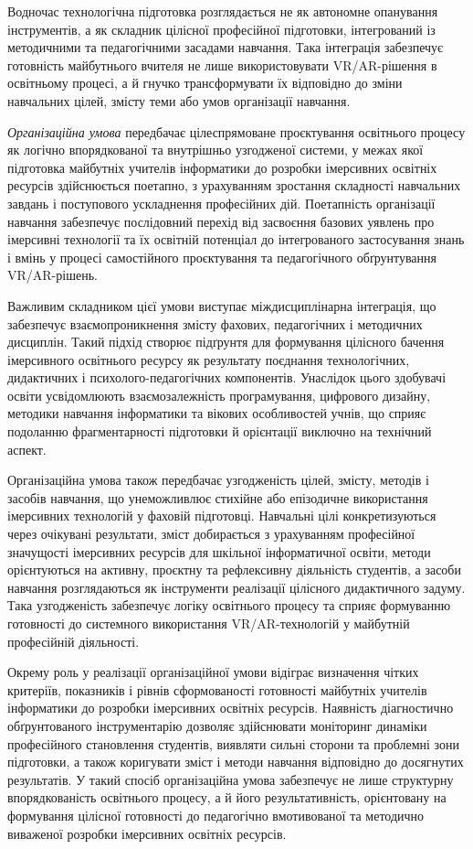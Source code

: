 Водночас технологічна підготовка розглядається не як автономне опанування інструментів, а як складник цілісної професійної підготовки, інтегрований із методичними та педагогічними засадами навчання. Така інтеграція забезпечує готовність майбутнього вчителя не лише використовувати VR/AR-рішення в освітньому процесі, а й гнучко трансформувати їх відповідно до зміни навчальних цілей, змісту теми або умов організації навчання.

\emph{Організаційна умова} передбачає цілеспрямоване проєктування освітнього процесу як логічно впорядкованої та внутрішньо узгодженої системи, у межах якої підготовка майбутніх учителів інформатики до розробки імерсивних освітніх ресурсів здійснюється поетапно, з урахуванням зростання складності навчальних завдань і поступового ускладнення професійних дій. Поетапність організації навчання забезпечує послідовний перехід від засвоєння базових уявлень про імерсивні технології та їх освітній потенціал до інтегрованого застосування знань і вмінь у процесі самостійного проєктування та педагогічного обґрунтування VR/AR-рішень.

Важливим складником цієї умови виступає міждисциплінарна інтеграція, що забезпечує взаємопроникнення змісту фахових, педагогічних і методичних дисциплін. Такий підхід створює підґрунтя для формування цілісного бачення імерсивного освітнього ресурсу як результату поєднання технологічних, дидактичних і психолого-педагогічних компонентів. Унаслідок цього здобувачі освіти усвідомлюють взаємозалежність програмування, цифрового дизайну, методики навчання інформатики та вікових особливостей учнів, що сприяє подоланню фрагментарності підготовки й орієнтації виключно на технічний аспект.

Організаційна умова також передбачає узгодженість цілей, змісту, методів і засобів навчання, що унеможливлює стихійне або епізодичне використання імерсивних технологій у фаховій підготовці. Навчальні цілі конкретизуються через очікувані результати, зміст добирається з урахуванням професійної значущості імерсивних ресурсів для шкільної інформатичної освіти, методи орієнтуються на активну, проєктну та рефлексивну діяльність студентів, а засоби навчання розглядаються як інструменти реалізації цілісного дидактичного задуму. Така узгодженість забезпечує логіку освітнього процесу та сприяє формуванню готовності до системного використання VR/AR-технологій у майбутній професійній діяльності.

Окрему роль у реалізації організаційної умови відіграє визначення чітких критеріїв, показників і рівнів сформованості готовності майбутніх учителів інформатики до розробки імерсивних освітніх ресурсів. Наявність діагностично обґрунтованого інструментарію дозволяє здійснювати моніторинг динаміки професійного становлення студентів, виявляти сильні сторони та проблемні зони підготовки, а також коригувати зміст і методи навчання відповідно до досягнутих результатів. У такий спосіб організаційна умова забезпечує не лише структурну впорядкованість освітнього процесу, а й його результативність, орієнтовану на формування цілісної готовності до педагогічно вмотивованої та методично виваженої розробки імерсивних освітніх ресурсів.

